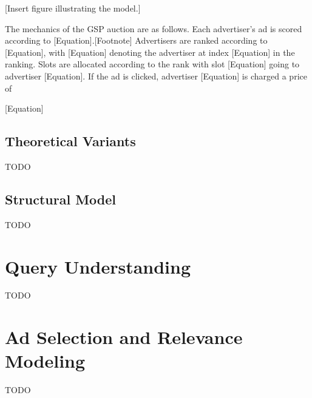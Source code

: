 \documentclass[prodmode,acmtist]{acmsmall} %
\begin{document}
[Insert figure illustrating the model.] 

The mechanics of the GSP auction are as follows.  
Each advertiser’s ad is scored according to [Equation].[Footnote]  
Advertisers are ranked according to [Equation], with [Equation] denoting the advertiser at index [Equation] in the ranking.  
Slots are allocated according to the rank with slot [Equation] going to advertiser [Equation].  
If the ad is clicked, advertiser [Equation] is charged a price of 

[Equation] 



\subsection{Theoretical Variants} %
\label{sub:theoretical_variants}

TODO


\subsection{Structural Model} %
\label{sub:structural_model}

TODO


\section{Query Understanding} %
\label{sec:query_understanding}

TODO


\section{Ad Selection and Relevance Modeling} %
\label{sec:ad_selection_and_relevance_modeling}

TODO

\end{document}
